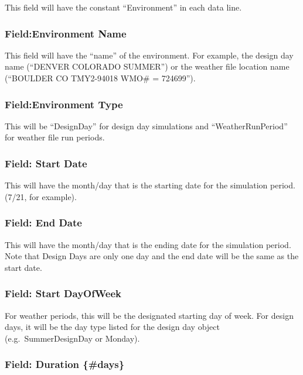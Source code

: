 This field will have the constant ``Environment'' in each data line.

\subsubsection{Field:Environment Name}\label{fieldenvironment-name}

This field will have the ``name'' of the environment. For example, the design day name (``DENVER COLORADO SUMMER'') or the weather file location name (``BOULDER CO TMY2-94018 WMO\# = 724699'').

\subsubsection{Field:Environment Type}\label{fieldenvironment-type}

This will be ``DesignDay'' for design day simulations and ``WeatherRunPeriod'' for weather file run periods.

\subsubsection{Field: Start Date}\label{field-start-date}

This will have the month/day that is the starting date for the simulation period. (7/21, for example).

\subsubsection{Field: End Date}\label{field-end-date}

This will have the month/day that is the ending date for the simulation period. Note that Design Days are only one day and the end date will be the same as the start date.

\subsubsection{Field: Start DayOfWeek}\label{field-start-dayofweek}

For weather periods, this will be the designated starting day of week. For design days, it will be the day type listed for the design day object (e.g.~SummerDesignDay or Monday).

\subsubsection{Field: Duration \{\#days\}}\label{field-duration-days}


